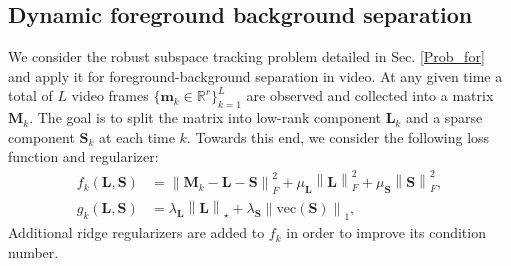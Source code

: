 \documentclass[draftcls,onecolumn,12pt]{IEEEtran}
\theoremstyle{plain}
\def\L{\mathbf{L}}
\def\M{\mathbf{M}}
\def\Rn{\mathbb{R}}
\def\S{\mathbf{S}}
\def\m{\boldsymbol{m}}
\providecommand{\norm}[1]{\left\|#1\right\|}
\providecommand{\vect}[1]{\text{vec}\left(#1\right)}
\theoremstyle{plain}
\theoremstyle{remark}
\begin{document}

%

\subsection{Dynamic foreground background separation}
We consider the robust subspace tracking problem detailed in Sec. \ref{Prob_for} and apply it for foreground-background separation in video. At any given time a total of $L$ video frames $\{\m_k \in \Rn^r\}_{k=1}^L$ are observed and collected into a matrix $\M_k$. The goal is to split the matrix into low-rank component $\L_k$ and a sparse component $\S_k$ at each time $k$. Towards this end, we consider the following loss function and regularizer:
\begin{align}
f_k(\L,\S) &= \norm{\M_k-\L-\S}_F^2 + \mu_{\L}\norm{\L}_F^2 + \mu_{\S}\norm{\S}_F^2, \\
g_k(\L,\S) &= \lambda_{\L}\norm{\L}_{\star} + \lambda_{\S}\norm{\vect{\S}}_1 ,
\end{align}
Additional ridge regularizers are added to $f_k$ in order to improve its condition number.
\end{document}
